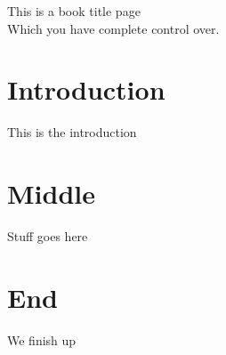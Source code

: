 \documentclass[a4paper,12pt]{book}
\begin{document}
\begin{titlepage}
\Large
\centering
    This is a book title page \\
\vspace{2cm}
   Which you have complete control over.
\end{titlepage}
\tableofcontents
\chapter{Introduction}
    This is the introduction
\chapter{Middle}
    Stuff goes here
\chapter{End}
    We finish up
\end{document}
